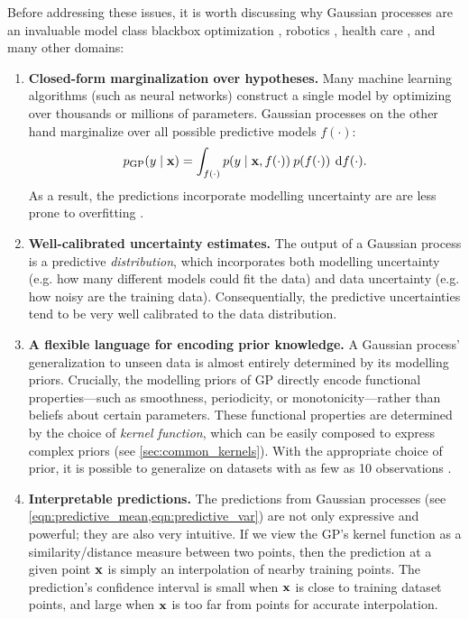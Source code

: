 Before addressing these issues, it is worth discussing why Gaussian processes are an invaluable model class blackbox optimization \cite{snoek2012practical}, robotics \cite{deisenroth2011pilco}, health care \cite{schulam2015framework}, and many other domains:
\begin{enumerate}
  \item {\bf Closed-form marginalization over hypotheses.}
    Many machine learning algorithms (such as neural networks) construct a single model by optimizing over thousands or millions of parameters.
    Gaussian processes on the other hand marginalize over all possible predictive models $f(\cdot)$:
    \[
      p_\text{GP} ( y \mid \mathbf{x} ) = \int_{f(\cdot)} p( y \mid \mathbf{x}, f(\cdot)) \: p(f(\cdot)) \: \,\mathrm{d}{f}(\cdot).
    \]
    As a result, the predictions incorporate modelling uncertainty are are less prone to overfitting \cite{rasmussen2006gaussian}.

  \item {\bf Well-calibrated uncertainty estimates.}
    The output of a Gaussian process is a predictive \emph{distribution}, which incorporates both modelling uncertainty (e.g. how many different models could fit the data) and data uncertainty (e.g. how noisy are the training data).
    Consequentially, the predictive uncertainties tend to be very well calibrated to the data distribution.

  \item {\bf A flexible language for encoding prior knowledge.}
    A Gaussian process' generalization to unseen data is almost entirely determined by its modelling priors.
    Crucially, the modelling priors of GP directly encode functional properties---such as smoothness, periodicity, or monotonicity---rather than beliefs about certain parameters.
    These functional properties are determined by the choice of \emph{kernel function}, which can be easily composed to express complex priors (see \cref{sec:common_kernels}).
    With the appropriate choice of prior, it is possible to generalize on datasets with as few as 10 observations \citep[e.g.]{rasmussen2006gaussian,gardner2017discovering}.

  \item {\bf Interpretable predictions.}
    The predictions from Gaussian processes (see \cref{eqn:predictive_mean,eqn:predictive_var}) are not only expressive and powerful; they are also very intuitive.
    If we view the GP's kernel function as a similarity/distance measure between two points, then the prediction at a given point $\mathbf{x}$ is simply an interpolation of nearby training points.
    The prediction's confidence interval is small when $\mathbf{x}$ is close to training dataset points, and large when $\mathbf{x}$ is too far from points for accurate interpolation.
\end{enumerate}

